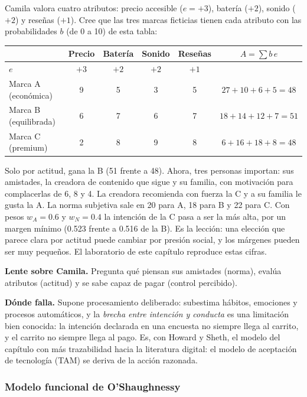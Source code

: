 \begin{cajaEjemplo}[title={Ejemplo con números: los audífonos de Camila}]
Camila valora cuatro atributos: precio accesible ($e=+3$), batería ($+2$), sonido
($+2$) y reseñas ($+1$). Cree que las tres marcas ficticias tienen cada
atributo con las probabilidades $b$ (de 0 a 10) de esta tabla:

\begin{center}
\footnotesize
\begin{tabular}{@{}lcccc|c@{}}
\toprule
 & Precio & Batería & Sonido & Reseñas & $A=\sum b\,e$ \\
\midrule
$e$ & $+3$ & $+2$ & $+2$ & $+1$ & \\
Marca A (económica) & 9 & 5 & 3 & 5 & $27+10+6+5=48$ \\
Marca B (equilibrada) & 6 & 7 & 6 & 7 & $18+14+12+7=51$ \\
Marca C (premium) & 2 & 8 & 9 & 8 & $6+16+18+8=48$ \\
\bottomrule
\end{tabular}
\end{center}

Solo por actitud, gana la B (51 frente a 48). Ahora, tres personas importan:
sus amistades, la creadora de contenido que sigue y su familia, con motivación
para complacerlas de 6, 8 y 4. La creadora recomienda con fuerza la C y a su
familia le gusta la A. La norma subjetiva sale en 20 para A, 18 para B y 22 para
C. Con pesos $w_A=0.6$ y $w_N=0.4$ la intención de la C pasa a ser la más alta,
por un margen mínimo (0.523 frente a 0.516 de la B). Es la lección: una elección
que parece clara por actitud puede cambiar por presión social, y los márgenes
pueden ser muy pequeños. El laboratorio de este capítulo reproduce estas cifras.
\end{cajaEjemplo}

\textbf{Lente sobre Camila.} Pregunta qué piensan sus amistades (norma),
evalúa atributos (actitud) y se sabe capaz de pagar (control percibido).

\textbf{Dónde falla.} Supone procesamiento deliberado: subestima hábitos,
emociones y procesos automáticos, y la \emph{brecha entre intención y
conducta} es una limitación bien conocida: la intención declarada en una
encuesta no siempre llega al carrito, y el carrito no siempre llega al pago.
Es, con Howard y Sheth, el modelo del capítulo con más trazabilidad hacia la
literatura digital: el modelo de aceptación de tecnología (TAM) se deriva de la acción razonada.

\subsubsection{Modelo funcional de O'Shaughnessy}
\label{sec:cap09-oshaughnessy}

